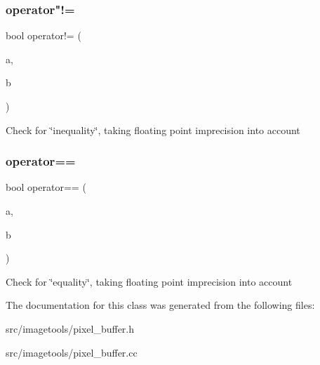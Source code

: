\subsubsection{\texorpdfstring{operator"!=}{operator!=}}
{\footnotesize\ttfamily bool operator!= (\begin{DoxyParamCaption}\item[{const \hyperlink{classimage__tools_1_1PixelBuffer}{Pixel\+Buffer} \&}]{a,  }\item[{const \hyperlink{classimage__tools_1_1PixelBuffer}{Pixel\+Buffer} \&}]{b }\end{DoxyParamCaption})\hspace{0.3cm}{\ttfamily [friend]}}

Check for \char`\"{}inequality\char`\"{}, taking floating point imprecision into account \mbox{\label{classimage__tools_1_1PixelBuffer_a68aef4100a6c7062d102b566dc382543}} 
\subsubsection{\texorpdfstring{operator==}{operator==}}
{\footnotesize\ttfamily bool operator== (\begin{DoxyParamCaption}\item[{const \hyperlink{classimage__tools_1_1PixelBuffer}{Pixel\+Buffer} \&}]{a,  }\item[{const \hyperlink{classimage__tools_1_1PixelBuffer}{Pixel\+Buffer} \&}]{b }\end{DoxyParamCaption})\hspace{0.3cm}{\ttfamily [friend]}}

Check for \char`\"{}equality\char`\"{}, taking floating point imprecision into account 

The documentation for this class was generated from the following files\+:\begin{DoxyCompactItemize}
\item 
src/imagetools/pixel\+\_\+buffer.\+h\item 
src/imagetools/pixel\+\_\+buffer.\+cc\end{DoxyCompactItemize}
